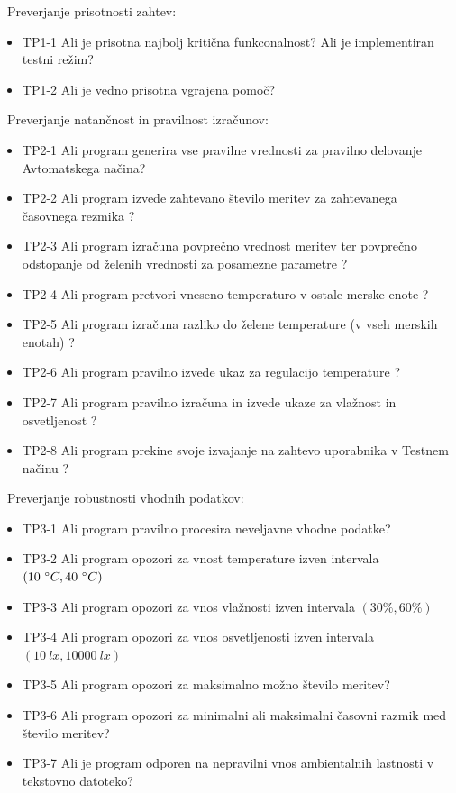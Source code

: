 \documentclass[a4paper,12pt]{article}
\begin{document}
			
			\ Preverjanje prisotnosti zahtev:
				\begin{itemize}

					\item TP1-1 Ali je prisotna najbolj kritična funkconalnost?
							Ali je implementiran testni režim?

					\item TP1-2 Ali je vedno prisotna vgrajena pomoč?


				\end{itemize}
			\ Preverjanje natančnost in pravilnost izračunov:
				\begin{itemize}
					\item TP2-1 Ali program generira vse pravilne vrednosti za pravilno delovanje Avtomatskega načina?
					\item TP2-2 Ali program izvede zahtevano število meritev za zahtevanega časovnega rezmika ?
					\item TP2-3 Ali program izračuna povprečno vrednost meritev ter povprečno odstopanje od želenih vrednosti za posamezne parametre ?
					\item TP2-4 Ali program pretvori vneseno temperaturo v ostale merske enote ?
					\item TP2-5 Ali program izračuna razliko do želene temperature (v vseh merskih enotah) ?
					\item TP2-6 Ali program pravilno izvede ukaz za regulacijo temperature ?
					\item TP2-7 Ali program pravilno izračuna in izvede ukaze za vlažnost in osvetljenost ? 
					\item TP2-8 Ali program prekine svoje izvajanje na zahtevo uporabnika v Testnem načinu ?
				\end{itemize}
			\ Preverjanje robustnosti vhodnih podatkov:
				\begin{itemize}

					\item TP3-1 Ali program pravilno procesira neveljavne vhodne podatke?
					\item TP3-2 Ali program opozori za vnost temperature izven intervala $(10\ \degree C,40\ \degree C)$
					\item TP3-3 Ali program opozori za vnos vlažnosti izven intervala $(30\%,60\%)$
					\item TP3-4 Ali program opozori za vnos osvetljenosti izven intervala $(10\ lx,10000\ lx)$
					\item TP3-5 Ali program opozori za maksimalno možno število meritev?
					\item TP3-6 Ali program opozori za minimalni ali maksimalni časovni razmik med število meritev?
					\item TP3-7 Ali je program odporen na nepravilni vnos ambientalnih lastnosti v tekstovno datoteko?

				\end{itemize}
			
\end{document}
